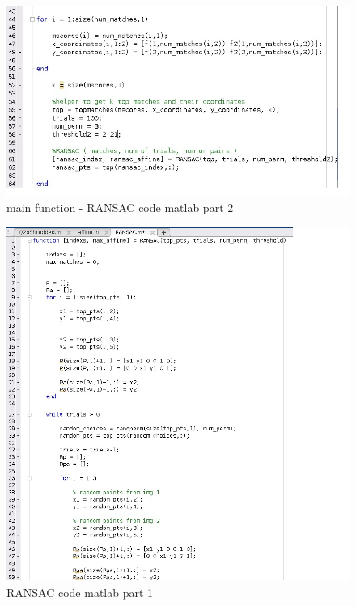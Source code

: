 \documentclass[]{article}
\begin{document}
\begin{figure}[h!]
\centering
\includegraphics[width=1.35\textwidth]{img/affine2.jpg}
\caption{main function - RANSAC code matlab part 2}
\end{figure}

\begin{figure}[h!]
\centering
\includegraphics[width=1.35\textwidth]{img/ransac1.jpg}
\caption{RANSAC code matlab part 1}
\end{figure}
\end{document}
